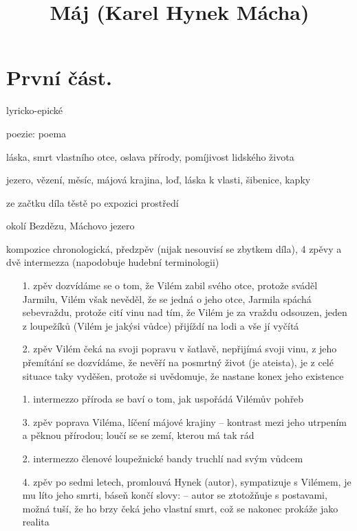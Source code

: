 \documentclass{article}
\title{\vspace{-2cm}Máj (Karel Hynek Mácha)\vspace{-2cm}}
\date{}
\author{}
\begin{document}
\maketitle
\section{První část.}
\begin{description}
    \setlength\itemsep{0.15em}
    \item[druh:] lyricko-epické
    \item[žánr:] poezie: poema
    \item[téma:] láska, smrt vlastního otce, oslava přírody, pomíjivost lidského života
    \item[motivy:] jezero, vězení, měsíc, májová krajina, loď, láska k vlasti, šibenice, kapky
    \item[zařazení výňatku do kontextu díla:] ze začtku díla těstě po expozici prostředí
    \item[časoprostor:] okolí Bezdězu, Máchovo jezero
    \item[kompoziční výstavba:] kompozice chronologická, předzpěv (nijak nesouvisí se zbytkem díla), 4 zpěvy a dvě intermezza (napodobuje hudební terminologii)
    \begin{itemize}
        \vspace{-0.5em}
        \setlength\itemsep{0.15em}
        \item[1. zpěv] dozvídáme se o tom, že Vilém zabil svého otce, protože sváděl Jarmilu, Vilém však nevěděl, že se jedná o jeho otce, Jarmila spáchá sebevraždu, protože cití vinu nad tím, že Vilém je za vraždu odsouzen, jeden z loupežíků (Vilém je jakýsi vůdce) přijíždí na lodi a vše jí vyčítá
        \item[2. zpěv] Vilém čeká na svoji popravu v šatlavě, nepřijímá svoji vinu, z jeho přemítání se dozvídáme, že nevěří na posmrtný život (je ateista), je z celé situace taky vyděšen, protože si uvědomuje, že nastane konex jeho existence
        \item[1. intermezzo] příroda se baví o tom, jak uspořádá Vilémův pohřeb
        \item[3. zpěv] poprava Viléma, líčení májové krajiny -- kontrast mezi jeho utrpením a pěknou přírodou; loučí se se zemí, kterou má tak rád
        \item[2. intermezzo] členové loupežnické bandy truchlí nad svým vůdcem
        \item[4. zpěv] po sedmi letech, promlouvá Hynek (autor), sympatizuje s Vilémem, je mu líto jeho smrti, báseň končí slovy:  -- autor se ztotožňuje s postavami, možná tuší, že ho brzy čeká jeho vlastní smrt, což se nakonec prokáže jako realita
    \end{itemize}
\end{description}
\end{document}
